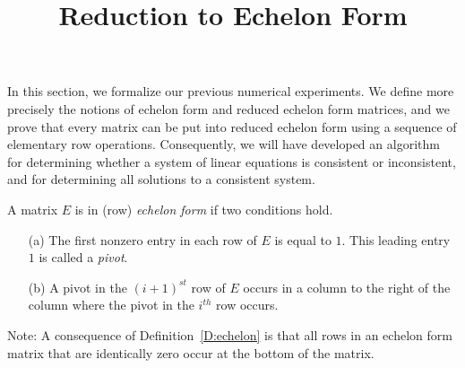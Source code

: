\documentclass{ximera}
\title{Reduction to Echelon Form}
\begin{document}
\begin{abstract}
\end{abstract}
\maketitle


\label{S:2.4}

In this section, we formalize our previous numerical
experiments.  We define more precisely the notions of echelon
form and reduced echelon form matrices, and we prove that every
matrix can be put into reduced echelon form using a sequence of
elementary row operations.  Consequently, we will have developed
an algorithm for determining whether a system of linear
equations is consistent or inconsistent, and for determining all
solutions to a consistent system.

\begin{definition} \label{D:echelon}
A matrix $E$ is in (row) {\em echelon form\/}  if two conditions hold.
\begin{enumerate}
\item[(a)] The first nonzero entry in each row of $E$ is equal
to $1$.  This leading entry $1$ is called a {\em pivot\/}. 
\item[(b)] A pivot in the $(i+1)^{st}$ row of $E$ occurs in a column to
the right of the column where the pivot in the $i^{th}$ row occurs.
\end{enumerate}
\end{definition}

Note: A consequence of Definition~\ref{D:echelon} is that all rows in 
an echelon form matrix that are identically zero occur at the bottom 
of the matrix.
\end{document}
